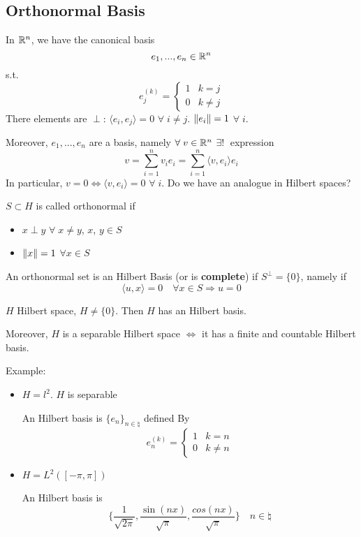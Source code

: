 \subsection*{Orthonormal Basis}

In \(\mathbb{R}^n\), we have the canonical basis
\[
    e_1, ..., e_n \in \mathbb{R}^n
\]
s.t.
\[
    e_j^{(k)} = 
    \begin{cases}
        1 & k=j \\
        0 & k \neq j   
    \end{cases}
\]
There elements are \(\perp\): \(\langle e_i, e_j\rangle   = 0\) \(\forall\; i \neq j\). \(\norm{e_i}=1\) \(\forall\; i\).

Moreover, \(e_1, ..., e_n\) are a basis, namely \(\forall\; v \in \mathbb{R}^n\) \(\exists! \;\) expression
\[
    v = \sum_{i=1}^n v_i e_i = \sum_{i=1}^n \langle v, e_i\rangle   e_i
\]
In particular, \(v=0 \Leftrightarrow \langle v, e_i\rangle  = 0\) \(\forall\; i\). Do we have an analogue in Hilbert spaces?

\begin{definition}
    \(S \subset H\) is called orthonormal if 
    \begin{itemize}
        \item \(x \perp y\) \(\forall\; x \neq y\), \(x\), \(y \in S\)
        \item \(\norm{x} = 1\) \(\forall x \in S\)
    \end{itemize}
\end{definition}
\begin{definition}
    An orthonormal set is an Hilbert Basis (or is \textbf{complete}) if \(S^\perp = \{0\}\), namely if 
    \[
        \langle u, x\rangle   = 0 \quad \forall x \in S \Rightarrow u=0
    \]
\end{definition}
\begin{theorem}
    \(H\) Hilbert space, \(H \neq \{0\}\). Then \(H\) has an Hilbert basis.

\noindent Moreover, \(H\) is a separable Hilbert space \(\Leftrightarrow \) it has a finite and countable Hilbert basis.
\end{theorem}

Example:
\begin{itemize}
    \item \(H = l^2\). \(H\) is separable
    
    An Hilbert basis is \(\{e_n\}_{n \in \natural}\) defined By
    \[
        e_n^{(k)} = 
        \begin{cases}
            1 & k=n \\
            0 & k \neq n
        \end{cases}
    \]

    \item \(H = L^2([-\pi, \pi])\)
    
    An Hilbert basis is
    \[
        \lbrace \frac{1}{\sqrt{2\pi}}, \frac{\sin(nx)}{\sqrt{\pi}}, \frac{cos(nx)}{\sqrt{\pi}} \rbrace \quad n \in \natural
    \]
\end{itemize}

